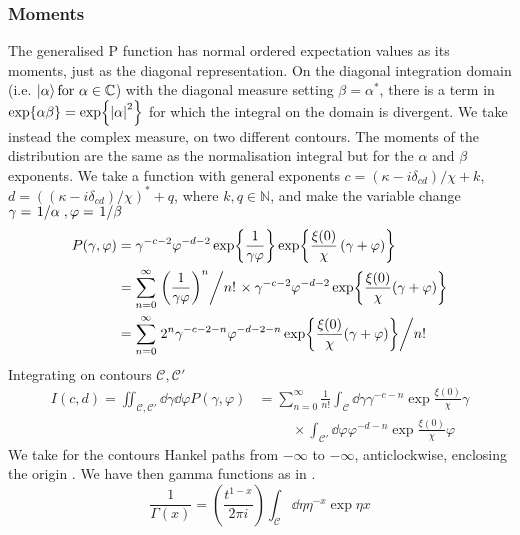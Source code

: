 \subsubsection{Moments}
The generalised P function has normal ordered expectation values as its moments, just as the diagonal representation.
On the diagonal integration domain (i.e. $\ket{\alpha} \text{for } \alpha \in \mathbb{C}$) with the diagonal measure setting $\beta = \alpha^*$, there is a term in $\exp{\alpha\beta} = \exp{\abs{\alpha}^2}$ for which the integral on the domain is divergent.
We take instead the complex measure, on two different contours.
The moments of the distribution are the same as the normalisation integral but for the $\alpha$ and $\beta$ exponents.
We take a function with general exponents $c = (\kappa-i\delta_{cd}) / \chi + k $, $d = ((\kappa-i\delta_{cd}) /\chi)^*+q$, where $k, q \in \mathbb{N}$, and make the variable change $\gamma = \flatfrac{1}{\alpha}, \varphi = \flatfrac{1}{\beta}$
\begin{align*}
  P(\gamma, \varphi) &= \gamma^{-c-2} \varphi^{-d-2} \exp{\frac{1}{\gamma\varphi}} \exp{\frac{\xi(0)}{\chi}\left(\gamma + \varphi \right)}\\
                     &= \sum_{n=0}^\infty\flatfrac{\left(\frac{1}{\gamma\varphi}\right)^n}{n!} \times \gamma^{-c-2}\varphi^{-d-2} \exp{\frac{\xi(0)}{\chi}(\gamma+\varphi)}\\
                     &= \sum_{n=0}^\infty\flatfrac{2^n \gamma^{-c-2-n}\varphi^{-d-2-n} \exp{\frac{\xi(0)}{\chi}(\gamma+ \varphi)}}{n!}
\end{align*}
Integrating on contours $\mathscr{C}, \mathscr{C'}$
\begin{align*}
  I(c, d) = \iint_{\mathscr{C}, \mathscr{C}'} \dd{\gamma}\dd{\varphi} P(\gamma, \varphi) &= \sum_{n=0}^\infty\frac{1}{n!} \int_\mathscr{C} \dd{\gamma} \gamma^{-c-n} \exp{\frac{\xi(0)}{\chi}\gamma} \\ 
                                                                                 & \qquad \ \ \times \int_{\mathscr{C}'}\dd{\varphi} \varphi^{-d-n} \exp{\frac{\xi(0)}{\chi}\varphi}
\end{align*}
We take for the contours Hankel paths from $-\infty$ to $-\infty$, anticlockwise, enclosing the origin \cite{Drummond1979}. 
We have then gamma functions as in \cite{TISP}.
\begin{equation}
     \frac{1}{\Gamma(x)} = \left(\frac{t^{1-x}}{2\pi i}\right) \int_{\mathscr{C}} \dd{\eta}\eta^{-x} \exp{\eta x}
\end{equation}
